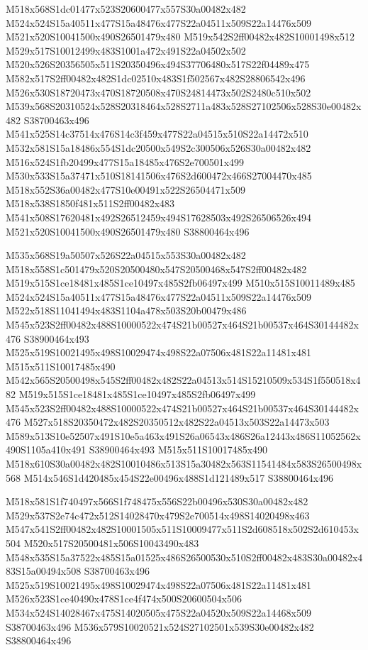\documentclass{article}
\begin{document}
\begin{multicols}{2}
M518x568S1dc01477x523S20600477x557S30a00482x482 M524x524S15a40511x477S15a48476x477S22a04511x509S22a14476x509 M521x520S10041500x490S26501479x480 M519x542S2ff00482x482S10001498x512 M529x517S10012499x483S1001a472x491S22a04502x502 M520x526S20356505x511S20350496x494S37706480x517S22f04489x475 M582x517S2ff00482x482S1dc02510x483S1f502567x482S28806542x496 M526x530S18720473x470S18720508x470S24814473x502S2480c510x502 M539x568S20310524x528S20318464x528S2711a483x528S27102506x528S30e00482x482 S38700463x496 M541x525S14c37514x476S14c3f459x477S22a04515x510S22a14472x510 M532x581S15a18486x554S1dc20500x549S2c300506x526S30a00482x482 M516x524S1fb20499x477S15a18485x476S2e700501x499 M530x533S15a37471x510S18141506x476S2d600472x466S27004470x485 M518x552S36a00482x477S10e00491x522S26504471x509 M518x538S1850f481x511S2ff00482x483 M541x508S17620481x492S26512459x494S17628503x492S26506526x494 M521x520S10041500x490S26501479x480 S38800464x496

M535x568S19a50507x526S22a04515x553S30a00482x482 M518x558S1c501479x520S20500480x547S20500468x547S2ff00482x482 M519x515S1ce18481x485S1ce10497x485S2fb06497x499 M510x515S10011489x485 M524x524S15a40511x477S15a48476x477S22a04511x509S22a14476x509 M522x518S11041494x483S1104a478x503S20b00479x486 M545x523S2ff00482x488S10000522x474S21b00527x464S21b00537x464S30144482x476 S38900464x493 M525x519S10021495x498S10029474x498S22a07506x481S22a11481x481 M515x511S10017485x490 M542x565S20500498x545S2ff00482x482S22a04513x514S15210509x534S1f550518x482 M519x515S1ce18481x485S1ce10497x485S2fb06497x499 M545x523S2ff00482x488S10000522x474S21b00527x464S21b00537x464S30144482x476 M527x518S20350472x482S20350512x482S22a04513x503S22a14473x503 M589x513S10e52507x491S10e5a463x491S26a06543x486S26a12443x486S11052562x490S1105a410x491 S38900464x493 M515x511S10017485x490 M518x610S30a00482x482S10010486x513S15a30482x563S11541484x583S26500498x568 M514x546S1d420485x454S22e00496x488S1d121489x517 S38800464x496

M518x581S1f740497x566S1f748475x556S22b00496x530S30a00482x482 M529x537S2e74c472x512S14028470x479S2e700514x498S14020498x463 M547x541S2ff00482x482S10001505x511S10009477x511S2d608518x502S2d610453x504 M520x517S20500481x506S10043490x483 M548x535S15a37522x485S15a01525x486S26500530x510S2ff00482x483S30a00482x483S15a00494x508 S38700463x496 M525x519S10021495x498S10029474x498S22a07506x481S22a11481x481 M526x523S1ce40490x478S1ce4f474x500S20600504x506 M534x524S14028467x475S14020505x475S22a04520x509S22a14468x509 S38700463x496 M536x579S10020521x524S27102501x539S30e00482x482 S38800464x496


\end{multicols}
\end{document}
